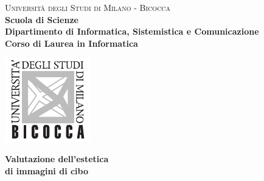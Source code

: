 \begin{titlepage}
        
        \centering
        
        \begin{minipage}[t]{1\textwidth}
        	\centering
        {
                {\large \textsc{Università degli Studi di Milano - Bicocca}} \\
                \large \textbf{Scuola di Scienze} \\
                \large \textbf{Dipartimento di Informatica, Sistemistica e Comunicazione} \\
                \large \textbf{Corso di Laurea in Informatica} \\
                \par
        }
        \end{minipage}
        
        \centering
        \begin{minipage}[t]{\textwidth}
        	\vspace{7mm}
        \end{minipage}
         
        \centering
        \begin{minipage}[t]{1\textwidth}
       	\centering
        \includegraphics[scale=1.4, draft=false]{images/logo_unimib.pdf}
        \end{minipage}
        
        \begin{minipage}[t]{\textwidth}
        \end{minipage}
        
		\vspace{10mm}
        
		\begin{center}
			\Huge{
				 \textbf{Valutazione dell’estetica \\di immagini di cibo}
				}
		\end{center}
        

\end{titlepage}
